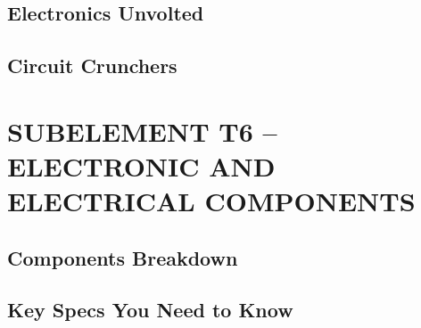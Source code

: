 \documentclass[12pt]{book}
\begin{document}
\section{Electronics Unvolted}













\section{Circuit Crunchers}














\chapter{SUBELEMENT T6 – ELECTRONIC AND ELECTRICAL COMPONENTS}
\section{Components Breakdown}












\section{Key Specs You Need to Know}












\end{document}
